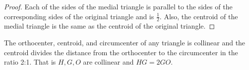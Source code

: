 \documentclass[11pt,twoside]{scrartcl}
\begin{document}
    \begin{proof}
        Each of the sides of the medial triangle is parallel to the sides of the corresponding sides of the original triangle and is $\frac{1}{2}$. Also, the centroid of the medial triangle is the same as the centroid of the original triangle.
    \end{proof}

    \begin{theorem}
        The orthocenter, centroid, and circumcenter of any triangle is collinear and the centroid divides the distance from the orthocenter to the circumcenter in the ratio 2:1. That is $H, G, O$ are collinear and $HG = 2 GO$.
    \end{theorem}
\end{document}

